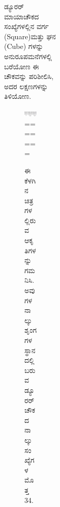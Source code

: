 \begin{figure}[H]
\begin{figure}[H]
\begin{figure}[H]
\begin{figure}[H]
\begin{figure}[H]
\begin{itemize}
	\item ಡ್ಯೂರರ್ ಮಾಯಾಚೌಕದ ಸಂಖ್ಯೆಗಳಲ್ಲಿನ ವರ್ಗ (Square)ಮತ್ತು ಘನ (Cube) ಗಳನ್ನು ಅನುರೂಪಮನೆಗಳಲ್ಲಿ ಬರೆಯೋಣ
	ಈ ಚೌಕವನ್ನು ಪರಿಶೀಲಿಸಿ, ಅದರ ಲಕ್ಷಣಗಳನ್ನು ತಿಳಿಯೋಣ.
	\begin{figure}[H]
	\includegraphics{src/figures/chap4/fig4-20.jpg}
=======
	\item ಈ ಕೆಳಗಿನ ಚಿತ್ರಗಳಲ್ಲಿರುವ ಆಕೃತಿಗಳನ್ನು ಗಮನಿಸಿ. ಅವುಗಳ ನಾಲ್ಕು ಶೃಂಗಗಳ\break ಸ್ಥಾನದಲ್ಲಿ ಬರುವ ಡ್ಯೂರರ್ ಚೌಕದ ನಾಲ್ಕು ಸಂಖ್ಯೆಗಳ ಮೊತ್ತ 34.
	\begin{figure}[H]
	\includegraphics[scale=.75]{src/figures/chap4/fig4.16.jpg}
	\end{figure}
	\begin{figure}[H]
	\includegraphics[scale=.8]{src/figures/chap4/fig4.17.jpg}
	\end{figure}
	\begin{figure}[H]
	\includegraphics[scale=.8]{src/figures/chap4/fig4.18.jpg}
	\end{figure}

\end{figure}
\end{itemize}
\end{figure}
\end{figure}
\end{figure}
\end{figure}
\end{figure}
